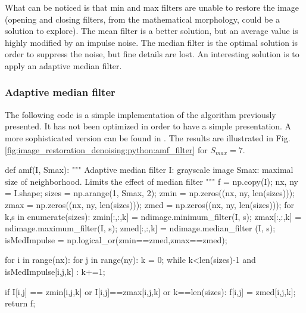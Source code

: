 What can be noticed is that min and max filters are unable to restore the image (opening and closing filters, from the mathematical morphology, could be a solution to explore). The mean filter is a better solution, but an average value is highly modified by an impulse noise. The median filter is the optimal solution is order to suppress the noise, but fine details are lost. An interesting solution is to apply an adaptive median filter. 

\subsubsection{Adaptive median filter}
The following code is a simple implementation of the algorithm previously presented. It has not been optimized in order to have a simple presentation. A more sophisticated version can be found in \cite{Gonzalez2002}. The results are illustrated in Fig.\ref{fig:image_restoration_denoising:python:amf_filter} for $S_{max}=7$.

\begin{python}
def amf(I, Smax):
    """
    Adaptive median filter
    I: grayscale image
    Smax: maximal size of neighborhood. Limits the effect of median filter
    """
    f = np.copy(I);
    nx, ny = I.shape;
    sizes = np.arange(1, Smax, 2);
    zmin = np.zeros((nx, ny, len(sizes)));
    zmax = np.zeros((nx, ny, len(sizes)));
    zmed = np.zeros((nx, ny, len(sizes)));
    for k,s in enumerate(sizes):
        zmin[:,:,k] = ndimage.minimum_filter(I, s);
        zmax[:,:,k] = ndimage.maximum_filter(I, s);
        zmed[:,:,k] = ndimage.median_filter (I, s);
    isMedImpulse = np.logical_or(zmin==zmed,zmax==zmed);
    
    for i in range(nx):
        for j in range(ny):
            k = 0;
            while k<len(sizes)-1 and isMedImpulse[i,j,k] :
                k+=1;
            
            if I[i,j] == zmin[i,j,k] or I[i,j]==zmax[i,j,k] or k==len(sizes):
                f[i,j] = zmed[i,j,k];
    return f;

\end{python}

